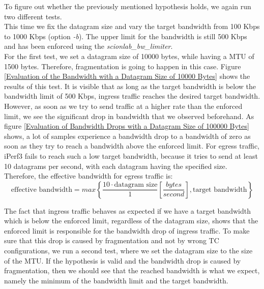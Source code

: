 To figure out whether the previously mentioned hypothesis holds, we again run two different tests.
\\
This time we fix the datagram size and vary the target bandwidth from 100 Kbps to 1000 Kbps (option \textit{-b}). The upper limit for the bandwidth is still 500 Kbps and has been enforced using the \textit{scionlab\_bw\_limiter}. 
\\
For the first test, we set a datagram size of 10000 bytes, while having a \acs{MTU} of 1500 bytes. Therefore, fragmentation is going to happen in this case. Figure \ref{Evaluation of the Bandwidth with a Datagram Size of 10000 Bytes} shows the results of this test. It is visible that as long as the target bandwidth is below the bandwidth limit of 500 Kbps, ingress traffic reaches the desired target bandwidth. However, as soon as we try to send traffic at a higher rate than the enforced limit, we see the significant drop in bandwidth that we observed beforehand. As figure \ref{Evaluation of Bandwidth Drops with a Datagram Size of 100000 Bytes} shows, a lot of samples experience a bandwidth drop to a bandwidth of zero as soon as they try to reach a bandwidth above the enforced limit. For egress traffic, iPerf3 fails to reach such a low target bandwidth, because it tries to send at least 10 datagrams per second, with each datagram having the specified size. Therefore, the effective bandwidth for egress traffic is: 
$$\text{effective bandwidth} = max\left\lbrace\frac{10\cdot \text{datagram size}}{1}\left[ \frac{bytes}{second} \right],\text{target bandwidth}\right\rbrace$$ 

The fact that ingress traffic behaves as expected if we have a target bandwidth which is below the enforced limit, regardless of the datagram size, shows that the enforced limit is responsible for the bandwidth drop of ingress traffic. To make sure that this drop is caused by fragmentation and not by wrong \acs{TC} configurations, we run a second test, where we set the datagram size to the size of the \acs{MTU}. If the hypothesis is valid and the bandwidth drop is caused by fragmentation, then we should see that the reached bandwidth is what we expect, namely the minimum of the bandwidth limit and the target bandwidth.

